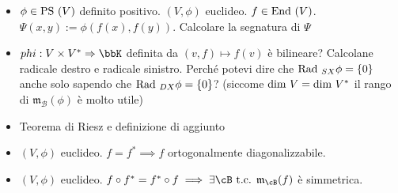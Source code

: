 \documentclass[a4paper,NoNotes,GeneralMath]{stdmdoc}
\begin{document}
\begin{itemize}
		\item $\phi \in \mbox{PS }(V)$ definito positivo. $(V, \phi)$ euclideo. $f \in \mbox{End }(V)$. $\Psi(x,y) := \phi(f(x), f(y))$. Calcolare la segnatura di $\Psi$
		\item $phi: V\times V^{*} \rar \bbK$ definita da $(v, f) \mapsto f(v)$ è bilineare? Calcolane radicale destro e radicale sinistro. Perché potevi dire che $\mbox{Rad }_{SX} \phi = \{0\}$ anche solo sapendo che $\mbox{Rad }_{DX} \phi = \{0\}$? (siccome $\mbox{dim } V = \mbox{dim } V^{*}$ il rango di $\mathfrak{m}_{\mathcal{B}}(\phi)$ è molto utile)
		\item Teorema di Riesz e definizione di aggiunto
		\item $(V, \phi)$ euclideo. $f = f^{*} \implies f$ ortogonalmente diagonalizzabile.
		\item $(V, \phi)$ euclideo. $f \circ f^{*} = f^{*} \circ f \implies \exists \cB \tc \mathfrak{m}_{\cB}(f)$ è simmetrica.
	\end{itemize}
\end{document}
